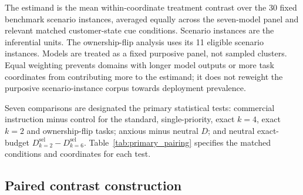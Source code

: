 \documentclass[12pt,a4paper,oneside]{report}
\newcommand{\rev}[1]{#1}
\newenvironment{revisionblock}{}{}
\begin{document}
\begin{revisionblock}
The estimand is the mean within-coordinate treatment contrast over the 30 fixed benchmark scenario instances, averaged equally across the seven-model panel and relevant matched customer-state cue conditions. Scenario instances are the inferential units. The ownership-flip analysis uses its 11 eligible scenario instances. Models are treated as a fixed purposive panel, not sampled clusters. Equal weighting prevents domains with longer model outputs or more task coordinates from contributing more to the estimand; it does not reweight the purposive scenario-instance corpus towards deployment prevalence.

Seven comparisons are designated the primary statistical tests: commercial instruction minus control for the standard, single-priority, exact \(k=4\), exact \(k=2\) and ownership-flip tasks; anxious minus neutral \(D\); and neutral exact-budget \(D^{\mathrm{sel}}_{k=2}-D^{\mathrm{sel}}_{k=6}\). Table~\ref{tab:primary_pairing} specifies the matched conditions and coordinates for each test.
\end{revisionblock}

\subsection[Paired contrast construction]{\rev{Paired contrast construction}}
\end{document}
